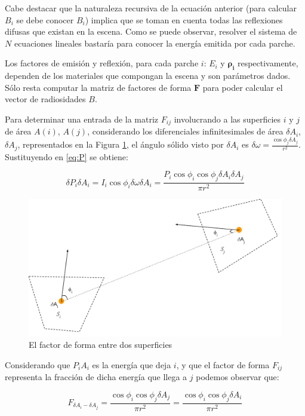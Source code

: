 Cabe destacar que la naturaleza recursiva de la ecuación anterior (para calcular $B_{i}$ se debe conocer $B_{i}$) implica que se toman en cuenta todas las reflexiones difusas que existan en la escena. Como se puede observar, resolver el sistema de $N$ ecuaciones lineales bastaría para conocer la energía emitida por cada parche. 

Los factores de emisión y reflexión, para cada parche $i$: $E_{i}$ y $\mathbf{\rho_{i}}$ respectivamente, dependen de los materiales que compongan la escena y son parámetros dados. Sólo resta computar la matriz de factores de forma $\mathbf{F}$ para poder calcular el vector de radiosidades $B$. 

Para determinar una entrada de la matriz $F_{ij}$ involucrando a las superficies $i$ y $j$ de área $A(i)$, $A(j)$, considerando los diferenciales infinitesimales de área $\delta{A_{i}}$, $\delta{A_{j}}$, representados en la Figura \ref{img:ff2}, el ángulo sólido visto por $\delta{A_{i}}$ es $\delta{\omega} = \frac{\cos{\phi_{j}\delta{A_{j}}}}{r^{2}}$. Sustituyendo en \eqref{eq:P} se obtiene:

\begin{equation}
    \delta{P}_{i}\delta{A_{i}} = I_{i} \cos{\phi_{i}}\delta{\omega}\delta{A_{i}} = \frac{P_{i}\cos{\phi_{i}}\cos{\phi_{j}}\delta{A_{i}}\delta{A_{j}}}{\pi r^{2}}
\end{equation}

\vspace{5mm}
\begin{figure}[h]
	\centering
	\includegraphics[width=0.8\linewidth]{assets/ff}
	\caption{El factor de forma entre dos superficies}
	\label{img:ff2}
\end{figure}


Considerando que ${P}_{i}{A_{i}}$ es la energía que deja $i$, y que el factor de forma $F_{ij}$ representa la fracción de dicha energía que llega a $j$ podemos observar que:

\begin{equation}
    F_{\delta{A_{i}}-\delta{A_{j}}} = \frac{\cos{\phi_{i}}\cos{\phi_{j}}\delta{A_{j}}}{\pi r^{2}} = \frac{\cos{\phi_{i}}\cos{\phi_{j}}\delta{A_{i}}}{\pi{r^{2}}}
\end{equation}


